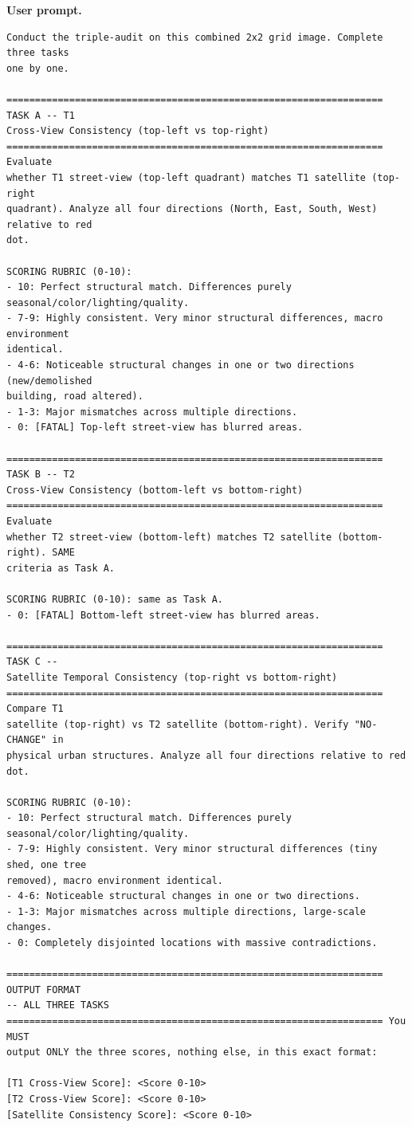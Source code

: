 \noindent\textbf{User prompt.}\par
\begingroup\fontsize{8}{10}\selectfont
\begin{promptbox}
\begin{verbatim}
Conduct the triple-audit on this combined 2x2 grid image. Complete three tasks
one by one.

================================================================== TASK A -- T1
Cross-View Consistency (top-left vs top-right)
================================================================== Evaluate
whether T1 street-view (top-left quadrant) matches T1 satellite (top-right
quadrant). Analyze all four directions (North, East, South, West) relative to red
dot.

SCORING RUBRIC (0-10):
- 10: Perfect structural match. Differences purely
seasonal/color/lighting/quality.
- 7-9: Highly consistent. Very minor structural differences, macro environment
identical.
- 4-6: Noticeable structural changes in one or two directions (new/demolished
building, road altered).
- 1-3: Major mismatches across multiple directions.
- 0: [FATAL] Top-left street-view has blurred areas.

================================================================== TASK B -- T2
Cross-View Consistency (bottom-left vs bottom-right)
================================================================== Evaluate
whether T2 street-view (bottom-left) matches T2 satellite (bottom-right). SAME
criteria as Task A.

SCORING RUBRIC (0-10): same as Task A.
- 0: [FATAL] Bottom-left street-view has blurred areas.

================================================================== TASK C --
Satellite Temporal Consistency (top-right vs bottom-right)
================================================================== Compare T1
satellite (top-right) vs T2 satellite (bottom-right). Verify "NO-CHANGE" in
physical urban structures. Analyze all four directions relative to red dot.

SCORING RUBRIC (0-10):
- 10: Perfect structural match. Differences purely
seasonal/color/lighting/quality.
- 7-9: Highly consistent. Very minor structural differences (tiny shed, one tree
removed), macro environment identical.
- 4-6: Noticeable structural changes in one or two directions.
- 1-3: Major mismatches across multiple directions, large-scale changes.
- 0: Completely disjointed locations with massive contradictions.

================================================================== OUTPUT FORMAT
-- ALL THREE TASKS
================================================================== You MUST
output ONLY the three scores, nothing else, in this exact format:

[T1 Cross-View Score]: <Score 0-10>
[T2 Cross-View Score]: <Score 0-10>
[Satellite Consistency Score]: <Score 0-10>
\end{verbatim}
\end{promptbox}
\endgroup

